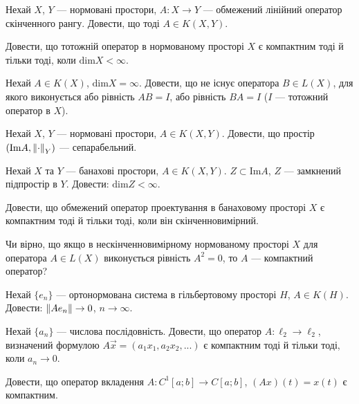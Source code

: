 \begin{exercise}
    Нехай $X$, $Y$ --- нормовані простори, $A: X \to Y$ --- обмежений лінійний оператор
    скінченного рангу. Довести, що тоді $A \in K(X, Y)$.
\end{exercise}

\begin{exercise}
    Довести, що тотожній оператор в нормованому просторі $X$ є компактним
    тоді й тільки тоді, коли $\mathrm{dim} X < \infty$.
\end{exercise}

\begin{exercise}
    Нехай $A \in K(X)$, $\mathrm{dim} X = \infty$. Довести, що не існує оператора
    $B \in L(X)$, для якого виконується або рівність $AB = I$, або рівність $BA = I$ 
    ($I$ --- тотожний оператор в $X$).
\end{exercise}

\begin{exercise}
    Нехай $X$, $Y$ --- нормовані простори, $A \in K(X, Y)$. Довести, що простір $\left( \mathrm{Im} A, \left\lVert\cdot\right\rVert_Y\right)$ --- сепарабельний.
\end{exercise}

\begin{exercise}
    Нехай $X$ та $Y$ --- банахові простори, $A \in K(X, Y)$. $Z \subset \mathrm{Im} A$, 
    $Z$ --- замкнений підпростір в $Y$. Довести: $\mathrm{dim} Z < \infty$.
\end{exercise}

\begin{exercise}
    Довести, що обмежений оператор проектування в банаховому просторі $X$
    є компактним тоді й тільки тоді, коли він скінченновимірний.
\end{exercise}

\begin{exercise}
    Чи вірно, що якщо в нескінченновимірному нормованому просторі $X$ для оператора $A \in L(X)$
    виконується рівність $A^2 = 0$, то $A$ --- компактний оператор?
\end{exercise}

\begin{exercise}
    Нехай $\{e_n\}$ --- ортонормована система в гільбертовому просторі $H$, $A \in K(H)$.
    Довести: $\left\lVert A e_n\right\rVert \to 0$, $n \to \infty$.
\end{exercise}

\begin{exercise}
    Нехай $\{a_n\}$ --- числова послідовність. Довести, що оператор $A: \ell_2 \to \ell_2$,
    визначений формулою $A\vec{x} = (a_1 x_1, a_2 x_2, ...)$ є компактним тоді й тільки тоді,
    коли $a_n \to 0$.
\end{exercise}

\begin{exercise}
    Довести, що оператор вкладення $A: C^1 [a;b] \to C[a;b]$, $(Ax)(t) = x(t)$ є компактним.
\end{exercise}